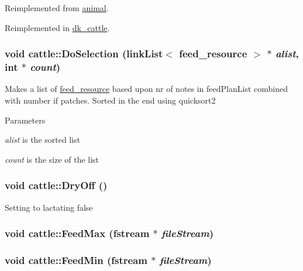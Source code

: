 Reimplemented from \hyperlink{classanimal_a96c8db4af03ae55b4acb96ed250ea065}{animal}.

Reimplemented in \hyperlink{classdk__cattle_a33ea8994d985d00a3c0910a44e7c5d15}{dk\_\-cattle}.\hypertarget{classcattle_abefde6a746b3d6d1d699225494f93022}{
\subsubsection[{DoSelection}]{\setlength{\rightskip}{0pt plus 5cm}void cattle::DoSelection ({\bf linkList}$<$ {\bf feed\_\-resource} $>$ $\ast$ {\em alist}, \/  int $\ast$ {\em count})}}
\label{classcattle_abefde6a746b3d6d1d699225494f93022}
Makes a list of \hyperlink{classfeed__resource}{feed\_\-resource} based upon nr of notes in feedPlanList combined with number if patches. Sorted in the end using quicksort2 
\begin{DoxyParams}{Parameters}
\item[{\em alist}]is the sorted list\item[{\em count}]is the size of the list\end{DoxyParams}
\hypertarget{classcattle_a4c5d739e38ea76e5615b53e5f588d771}{
\subsubsection[{DryOff}]{\setlength{\rightskip}{0pt plus 5cm}void cattle::DryOff ()}}
\label{classcattle_a4c5d739e38ea76e5615b53e5f588d771}
Setting to lactating false \hypertarget{classcattle_a65484ea0fdd7d59d96108c6ecc50e323}{
\subsubsection[{FeedMax}]{\setlength{\rightskip}{0pt plus 5cm}void cattle::FeedMax (fstream $\ast$ {\em fileStream})}}
\label{classcattle_a65484ea0fdd7d59d96108c6ecc50e323}
\hypertarget{classcattle_a9aff531955828de8e998e2e44ba6f935}{
\subsubsection[{FeedMin}]{\setlength{\rightskip}{0pt plus 5cm}void cattle::FeedMin (fstream $\ast$ {\em fileStream})}}
